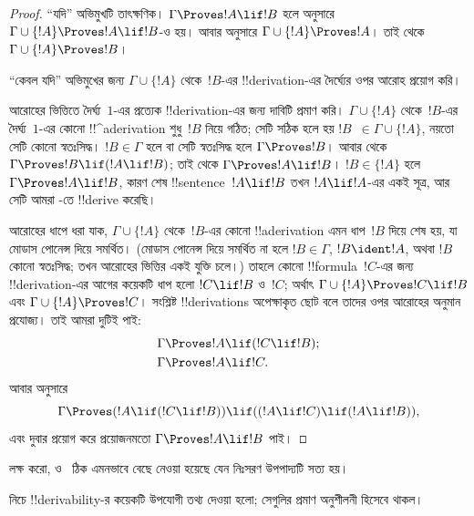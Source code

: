 \documentclass[../../../include/open-logic-section]{subfiles}
\begin{document}
\begin{proof}
``যদি'' অভিমুখটি তাৎক্ষণিক। $\Gamma \Proves !A \lif !B$ হলে
 অনুসারে $\Gamma \cup \{!A\} \Proves
!A \lif !B$-ও হয়। আবার  অনুসারে
$\Gamma \cup \{!A\} \Proves !A$। তাই  থেকে
$\Gamma \cup \{!A\} \Proves !B$।

``কেবল যদি'' অভিমুখের জন্য $\Gamma \cup \{!A\}$ থেকে~$!B$-এর
!!{derivation}-এর দৈর্ঘ্যের ওপর আরোহ প্রয়োগ করি।

আরোহের ভিত্তিতে দৈর্ঘ্য~$1$-এর প্রত্যেক !!{derivation}-এর জন্য
দাবিটি প্রমাণ করি। $\Gamma \cup \{!A\}$ থেকে~$!B$-এর দৈর্ঘ্য~$1$-এর
কোনো !!^a{derivation} শুধু~$!B$ নিয়ে গঠিত; সেটি সঠিক হলে হয়
$!B$~$\in \Gamma \cup \{!A\}$, নয়তো সেটি কোনো স্বতঃসিদ্ধ। $!B \in
\Gamma$ হলে বা সেটি স্বতঃসিদ্ধ হলে $\Gamma \Proves !B$। আবার
 থেকে $\Gamma \Proves !B \lif (!A \lif !B)$;
তাই  থেকে $\Gamma \Proves !A \lif !B$। $!B \in
\{!A\}$ হলে $\Gamma \Proves !A \lif !B$, কারণ শেষ !!{sentence}~$!A
\lif !B$ তখন $!A \lif !A$-এর একই সূত্র, আর সেটি আমরা
-তে !!{derive} করেছি।

আরোহের ধাপে ধরা যাক, $\Gamma \cup \{!A\}$ থেকে~$!B$-এর কোনো
!!a{derivation} এমন ধাপ~$!B$ দিয়ে শেষ হয়, যা মোডাস পোনেন্স দিয়ে
সমর্থিত। (মোডাস পোনেন্স দিয়ে সমর্থিত না হলে $!B \in \Gamma$,
$!B \ident !A$, অথবা $!B$ কোনো স্বতঃসিদ্ধ; তখন আরোহের ভিত্তির একই
যুক্তি চলে।) তাহলে কোনো !!{formula}~$!C$-এর জন্য !!{derivation}-এর
আগের কয়েকটি ধাপ হলো $!C \lif !B$ ও~$!C$; অর্থাৎ $\Gamma \cup
\{!A\} \Proves !C \lif !B$ এবং $\Gamma \cup \{!A\} \Proves !C$।
সংশ্লিষ্ট !!{derivation}s অপেক্ষাকৃত ছোট বলে তাদের ওপর আরোহের অনুমান
প্রযোজ্য। তাই আমরা দুটিই পাই:
\begin{align*}
  & \Gamma \Proves !A \lif (!C \lif !B); \\
  & \Gamma \Proves !A \lif !C.
\end{align*}
আবার  অনুসারে
\[
\Gamma \Proves (!A \lif (!C \lif !B)) \lif
((!A\lif !C)  \lif (!A \lif !B)),
\]
এবং  দুবার প্রয়োগ করে প্রয়োজনমতো $\Gamma \Proves
!A \lif !B$ পাই।
\end{proof}

লক্ষ করো,  ও~ ঠিক এমনভাবে
বেছে নেওয়া হয়েছে যেন নিঃসরণ উপপাদ্যটি সত্য হয়।

নিচে !!{derivability}-র কয়েকটি উপযোগী তথ্য দেওয়া হলো; সেগুলির
প্রমাণ অনুশীলনী হিসেবে থাকল।
\end{document}

